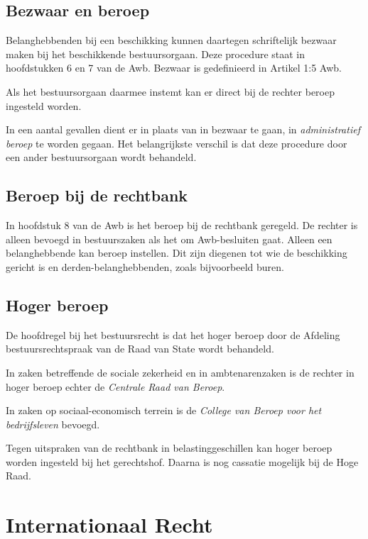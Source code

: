 \documentclass{article}
\begin{document}
\subsection{Bezwaar en beroep}

Belanghebbenden bij een beschikking kunnen daartegen schriftelijk bezwaar maken
bij het beschikkende bestuursorgaan. Deze procedure staat in hoofdstukken 6 en
7 van de Awb. Bezwaar is gedefinieerd in Artikel 1:5 Awb.

Als het bestuursorgaan daarmee instemt kan er direct bij de rechter beroep
ingesteld worden.

In een aantal gevallen dient er in plaats van in bezwaar te gaan, in
\emph{administratief beroep} te worden gegaan. Het belangrijkste verschil is
dat deze procedure door een ander bestuursorgaan wordt behandeld.

\subsection{Beroep bij de rechtbank}

In hoofdstuk 8 van de Awb is het beroep bij de rechtbank geregeld. De rechter
is alleen bevoegd in bestuurszaken als het om Awb-besluiten gaat. Alleen een
belanghebbende kan beroep instellen. Dit zijn diegenen tot wie de beschikking
gericht is en derden-belanghebbenden, zoals bijvoorbeeld buren.

\subsection{Hoger beroep}

De hoofdregel bij het bestuursrecht is dat het hoger beroep door de Afdeling
bestuursrechtspraak van de Raad van State wordt behandeld.

In zaken betreffende de sociale zekerheid en in ambtenarenzaken is de rechter
in hoger beroep echter de \emph{Centrale Raad van Beroep}.

In zaken op sociaal-economisch terrein is de \emph{College van Beroep voor het
bedrijfsleven} bevoegd.

Tegen uitspraken van de rechtbank in belastinggeschillen kan hoger beroep
worden ingesteld bij het gerechtshof. Daarna is nog cassatie mogelijk bij de
Hoge Raad.


\section{Internationaal Recht} \label{h15}
\end{document}
